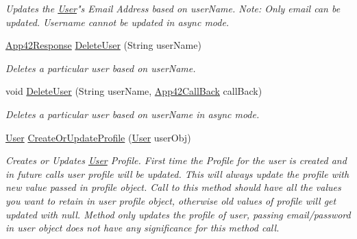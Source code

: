 \begin{DoxyCompactItemize}
\begin{DoxyCompactList}\small\item\em Updates the \hyperlink{classcom_1_1shephertz_1_1app42_1_1paas_1_1sdk_1_1csharp_1_1user_1_1_user}{User}"s Email Address based on user\+Name. Note\+: Only email can be updated. Username cannot be updated in async mode. \end{DoxyCompactList}\item 
\hyperlink{classcom_1_1shephertz_1_1app42_1_1paas_1_1sdk_1_1csharp_1_1_app42_response}{App42\+Response} \hyperlink{classcom_1_1shephertz_1_1app42_1_1paas_1_1sdk_1_1csharp_1_1user_1_1_user_service_a7dc82fd5b945f05bb96e62d49bbdc7c7}{Delete\+User} (String user\+Name)
\begin{DoxyCompactList}\small\item\em Deletes a particular user based on user\+Name. \end{DoxyCompactList}\item 
void \hyperlink{classcom_1_1shephertz_1_1app42_1_1paas_1_1sdk_1_1csharp_1_1user_1_1_user_service_aaec89a5a0f50612e40df17d318a7bdf4}{Delete\+User} (String user\+Name, \hyperlink{interfacecom_1_1shephertz_1_1app42_1_1paas_1_1sdk_1_1csharp_1_1_app42_call_back}{App42\+Call\+Back} call\+Back)
\begin{DoxyCompactList}\small\item\em Deletes a particular user based on user\+Name in async mode. \end{DoxyCompactList}\item 
\hyperlink{classcom_1_1shephertz_1_1app42_1_1paas_1_1sdk_1_1csharp_1_1user_1_1_user}{User} \hyperlink{classcom_1_1shephertz_1_1app42_1_1paas_1_1sdk_1_1csharp_1_1user_1_1_user_service_ab20fbc9f6d05b2939b7d6bd46f5a5521}{Create\+Or\+Update\+Profile} (\hyperlink{classcom_1_1shephertz_1_1app42_1_1paas_1_1sdk_1_1csharp_1_1user_1_1_user}{User} user\+Obj)
\begin{DoxyCompactList}\small\item\em Creates or Updates \hyperlink{classcom_1_1shephertz_1_1app42_1_1paas_1_1sdk_1_1csharp_1_1user_1_1_user}{User} Profile. First time the Profile for the user is created and in future calls user profile will be updated. This will always update the profile with new value passed in profile object. Call to this method should have all the values you want to retain in user profile object, otherwise old values of profile will get updated with null. Method only updates the profile of user, passing email/password in user object does not have any significance for this method call. \end{DoxyCompactList}\item 

\end{DoxyCompactItemize}
